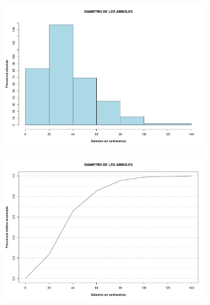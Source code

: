 \documentclass[11pt]{article}
\begin{document}
\newpage

\begin{figure}[h!]
  \begin{center}
    \begin{subfigure}[b]{0.9\linewidth}
      \includegraphics[width=\linewidth]{histDiametro.pdf}
      \caption{}
      \label{fig:histDiametro}
    \end{subfigure}
  \end{center}
\end{figure}

\begin{figure}[h!]
  \ContinuedFloat
  \begin{center}
    \begin{subfigure}[b]{0.9\linewidth}
      \includegraphics[width=\linewidth]{acumDiametro.pdf}
      \caption{}
      \label{fig:acumDiametro}
    \end{subfigure}
    \caption{}
  \end{center}
\end{figure}
\end{document}
